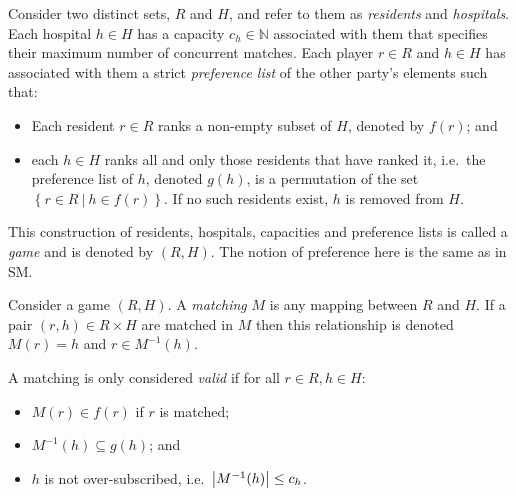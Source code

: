 \begin{definition}\label{def:hr_game}
    Consider two distinct sets, \(R\) and \(H\), and refer to them as
    \emph{residents} and \emph{hospitals}. Each hospital \(h \in H\) has a
    capacity \(c_h \in \mathbb{N}\) associated with them that specifies their
    maximum number of concurrent matches. Each player \(r \in R\) and \(h \in
    H\) has associated with them a strict \emph{preference list} of the other
    party's elements such that:
    
    \begin{itemize}
        \item Each resident \(r \in R\) ranks a non-empty subset of \(H\),
            denoted by \(f(r)\); and
        \item each \(h \in H\) ranks all and only those residents that have
            ranked it, i.e.\ the preference list of \(h\), denoted \(g(h)\), is
            a permutation of the set
            \(\left\{r \in R \ | \ h \in f(r)\right\}\). If no such residents
            exist, \(h\) is removed from \(H\).
    \end{itemize}
    
    This construction of residents, hospitals, capacities and preference lists
    is called a \emph{game} and is denoted by \((R, H)\). The notion of
    preference here is the same as in SM.
\end{definition}

\begin{definition}\label{def:hr_matching}
    Consider a game \((R, H)\). A \emph{matching} \(M\) is any mapping between
    \(R\) and \(H\). If a pair \((r, h) \in R \times H\) are matched in \(M\)
    then this relationship is denoted \(M(r) = h\) and \(r \in M^{-1}(h)\).

    A matching is only considered \emph{valid} if for all \(r \in R, h \in H\):

    \begin{itemize}
        \item \(M(r) \in f(r)\) if \(r\) is matched;
        \item \(M^{-1}(h) \subseteq g(h)\); and
        \item \(h\) is not over-subscribed, i.e.\ \(\abs*{M^{-1}(h)} \leq c_h\).
    \end{itemize}
\end{definition}

